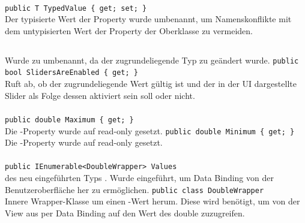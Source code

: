 \paragraph{}
\begin{itemize}
	\change \verb!public T TypedValue { get; set; }! \\
	Der typisierte Wert der Property wurde umbenannt, um Namenskonflikte mit dem untypisierten Wert der Property der Oberklasse zu vermeiden.
\end{itemize}

\subsection{}

\paragraph{}
\begin{itemize}
	\change Wurde zu  umbenannt, da der zugrundeliegende Typ zu  geändert wurde.
	\add \verb!public bool SlidersAreEnabled { get; }! \\
	Ruft ab, ob der zugrundeliegende Wert gültig ist und der in der UI dargestellte Slider als Folge dessen aktiviert sein soll oder nicht.
\end{itemize}

\paragraph{}
\begin{itemize}
	\change \verb!public double Maximum { get; }! \\
	Die -Property wurde auf read-only gesetzt.
	\change \verb!public double Minimum { get; }! \\
	Die -Property wurde auf read-only gesetzt.
\end{itemize}

\paragraph{}
\begin{itemize}
	\add \verb!public IEnumerable<DoubleWrapper> Values! \\
	 des neu eingeführten Typs . Wurde eingeführt, um Data Binding von der Benutzeroberfläche her zu ermöglichen.
	\add \verb!public class DoubleWrapper! \\
	Innere Wrapper-Klasse um einen -Wert herum. Diese wird benötigt, um von der View aus per Data Binding auf den Wert des double zuzugreifen.
\end{itemize}

